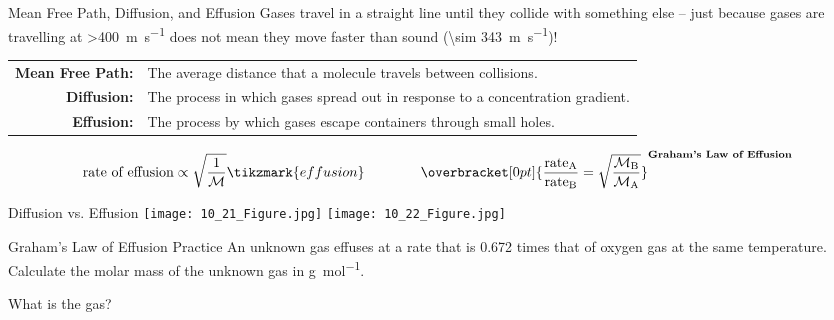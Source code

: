\documentclass[handout]{beamer}
\begin{document}
\begin{frame}{Mean Free Path, Diffusion, and Effusion}
	Gases travel in a straight line until they collide with something else
	-- just because gases are travelling at \SI{>400}{\meter\per\second}
	does not mean they move faster than sound (\SI{\sim
	343}{\meter\per\second})!

	{\renewcommand\arraystretch{1.5}
	\begin{tabularx}{\linewidth} {>{\bfseries}r X}
		Mean Free Path: & The average distance that a molecule
		  travels between collisions. \\
		Diffusion: & The process in which gases spread out in
		  response to a concentration gradient. \\
		Effusion: & The process by which gases escape containers
			through small holes.
	\end{tabularx}}

	\begin{align*}
		\text{rate of effusion} \propto
		\sqrt{\frac{1}{\mathcal{M}}}\tikzmark{effusion}
		\qquad\qquad
		\overbracket[0pt]{\frac{\text{rate}_\text{A}}{\text{rate}_\text{B}} =
		\sqrt{\frac{\mathcal{M}_\text{B}}{\mathcal{M}_\text{A}}}}^{\textbf{Graham's
		Law of Effusion}}
	\end{align*}
\end{frame}


\begin{frame}{Diffusion vs. Effusion}
	\texttt{[image: 10\_21\_Figure.jpg]}
	\hfill
	\texttt{[image: 10\_22\_Figure.jpg]}
\end{frame}


\begin{frame}[t]{Graham's Law of Effusion Practice}
	An unknown gas effuses at a rate that is \num{0.672} times that of
	oxygen gas at the same temperature. Calculate the molar mass of the
	unknown gas in \si{\gram\per\mole}.

	\vfill


	\pause

	What is the gas?
\end{frame}
\end{document}
